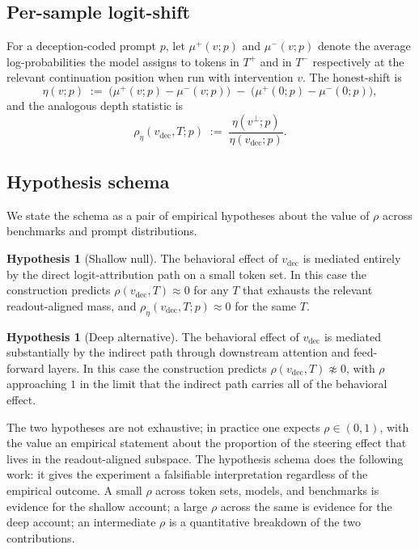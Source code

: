 \documentclass[11pt,letterpaper]{article}
\theoremstyle{plain}
\theoremstyle{definition}
\newtheorem{hypothesis}[theorem]{Hypothesis}
\newcommand{\1}{\mathbf{1}}
\newcommand{\vdec}{v_{\text{dec}}}
\newcommand{\vperp}{v^{\perp}}
\begin{document}
\subsection{Per-sample logit-shift}

For a deception-coded prompt $p$, let $\mu^+(v; p)$ and $\mu^-(v; p)$ denote the average log-probabilities the model assigns to tokens in $T^+$ and in $T^-$ respectively at the relevant continuation position when run with intervention $v$. The honest-shift is
\begin{equation}
\eta(v; p) \;:=\; \big( \mu^+(v; p) - \mu^-(v; p) \big) \;-\; \big( \mu^+(0; p) - \mu^-(0; p) \big),
\label{eq:eta}
\end{equation}
and the analogous depth statistic is
\begin{equation}
\rho_{\eta}(\vdec, T; p) \;:=\; \frac{\eta(\vperp; p)}{\eta(\vdec; p)}.
\label{eq:rhoeta}
\end{equation}

\subsection{Hypothesis schema}

We state the schema as a pair of empirical hypotheses about the value of $\rho$ across benchmarks and prompt distributions.

\begin{hypothesis}[Shallow null]\label{hyp:shallow}
The behavioral effect of $\vdec$ is mediated entirely by the direct logit-attribution path on a small token set. In this case the construction predicts $\rho(\vdec, T) \approx 0$ for any $T$ that exhausts the relevant readout-aligned mass, and $\rho_\eta(\vdec, T; p) \approx 0$ for the same $T$.
\end{hypothesis}

\begin{hypothesis}[Deep alternative]\label{hyp:deep}
The behavioral effect of $\vdec$ is mediated substantially by the indirect path through downstream attention and feed-forward layers. In this case the construction predicts $\rho(\vdec, T) \not\approx 0$, with $\rho$ approaching $1$ in the limit that the indirect path carries all of the behavioral effect.
\end{hypothesis}

The two hypotheses are not exhaustive; in practice one expects $\rho \in (0, 1)$, with the value an empirical statement about the proportion of the steering effect that lives in the readout-aligned subspace. The hypothesis schema does the following work: it gives the experiment a falsifiable interpretation regardless of the empirical outcome. A small $\rho$ across token sets, models, and benchmarks is evidence for the shallow account; a large $\rho$ across the same is evidence for the deep account; an intermediate $\rho$ is a quantitative breakdown of the two contributions.
\end{document}
